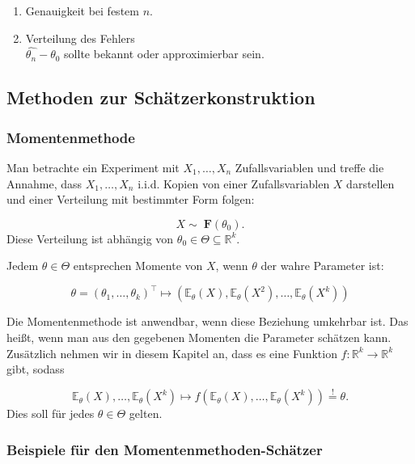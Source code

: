 \documentclass[10pt]{article}
\newcommand{\FZV}{X_1, \ldots, X_n} %
\newcommand{\IR}{\mathbb{R}} %
\newcommand{\EW}{\mathbb{E}} %
\begin{document}
\begin{enumerate}
	\item Genauigkeit bei festem $n$.
	\item Verteilung des Fehlers\\
	$\hat{\theta_n}-\theta_0$ sollte bekannt oder approximierbar sein. 
	
\end{enumerate}

\subsection{Methoden zur Schätzerkonstruktion}
\subsubsection{Momentenmethode}

Man betrachte ein Experiment mit $\FZV$ Zufallsvariablen und treffe die Annahme, dass $\FZV$ i.i.d. Kopien von einer Zufallsvariablen $X$ darstellen und einer Verteilung mit bestimmter Form folgen:

\vspace{-2mm}
\begin{equation*}
	X \sim \; \textbf{F}(\theta_0).
\end{equation*}
Diese Verteilung ist abhängig von $\theta_0 \in \Theta \subseteq \IR^k$.

\noindent Jedem $\theta \in \Theta$ entsprechen Momente von $X$, wenn $\theta$ der wahre Parameter ist: 

\begin{equation*}
	\theta = (\theta_1, \ldots, \theta_k)^\top \mapsto (\EW_\theta(X), \EW_\theta(X^2),\ldots,\EW_\theta(X^k))
\end{equation*}

\noindent Die Momentenmethode ist anwendbar, wenn diese Beziehung umkehrbar ist. Das heißt, wenn man aus den gegebenen Momenten die Parameter schätzen kann. Zusätzlich nehmen wir in diesem Kapitel an, dass es eine Funktion $f: \IR^k \rightarrow \IR^k$ gibt, sodass 

\begin{equation*}
	\EW_\theta(X),\ldots,\EW_\theta(X^k) \mapsto f(\EW_\theta(X),\ldots,\EW_\theta(X^k)) \overset{!}= \theta.
\end{equation*}
Dies soll für jedes $\theta \in \Theta$ gelten.

\subsubsection{Beispiele für den Momentenmethoden-Schätzer}
\end{document}
